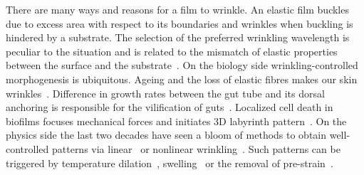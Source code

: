 \documentclass[twocolumn,superscriptaddress,showpacs,preprintnumbers,
amsmath,amssymb,prl]{revtex4-1}
\begin{document}

There are many ways and reasons for a film to wrinkle. An elastic film buckles due to excess area with respect to its boundaries and wrinkles when buckling is hindered by a substrate. The selection of the preferred wrinkling wavelength is peculiar to the situation and is related to the mismatch of elastic properties between the surface and the substrate~\cite{Gough1940, Bijlaard1946, Biot1957, Bowden1998, Cerda2003, Genzer2006}.  On the biology side wrinkling-controlled morphogenesis is ubiquitous. Ageing and the loss of elastic fibres makes our skin wrinkles~\cite{Bissett1987, Genzer2006}. Difference in growth rates between the gut tube and its dorsal anchoring is responsible for the vilification of guts~\cite{Savin2011, Ciarletta2014, Shyer2013}. Localized cell death in biofilms focuses mechanical forces and initiates 3D labyrinth pattern~\cite{Trejo2013, Asally2012}. On the physics side the last two decades have seen a bloom of methods to obtain well-controlled patterns via linear~\cite{Bowden1998, Genzer2006, Hu1998, Kim2010, Vandeparre2011, Li2013} or nonlinear wrinkling~\cite{Efimenko2005, Guvendiren2010, Kim2011a, Brau2011}. Such patterns can be triggered by temperature dilation~\cite{Bowden1998}, swelling~\cite{Hu1998} or the removal of pre-strain~\cite{Genzer2006}. 
\end{document}
